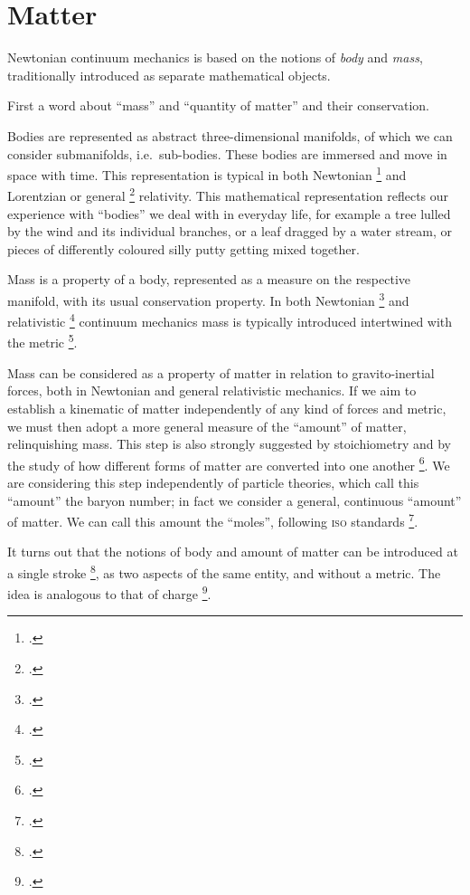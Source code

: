 \documentclass[\ifafour a4paper,12pt,\else a5paper,10pt,\fi%
onecolumn,oneside,article,%
british%
]{memoir}
\theoremstyle{remark}
\theoremstyle{innote}
\newcommand*{\citep}{\footcites}%
\renewcommand*{\|}{\nonscript\,\vert\nonscript\;\mathopen{}}
\newcommand*{\sect}{\S}%
\newcommand*{\sects}{\S\S}%
\newcommand*{\chap}{ch.}%
\newcommand*{\ie}{{i.e.}}
\newcommand*{\eg}{{e.g.}}
\newcommand*{\cf}{{cf.}}
\begin{document}
\section{Matter}
\label{sec:matter}


Newtonian continuum mechanics is based on the notions of \emph{body} and
\emph{mass}, traditionally introduced as separate mathematical objects.

First a word about \enquote{mass} and \enquote{quantity of matter} and
their conservation.

Bodies are represented as abstract three-dimensional manifolds, of which we
can consider submanifolds, \ie\ sub-bodies. These bodies are immersed and
move in space with time. This representation is typical in both Newtonian
\citep[\sects~I.2--3]{truesdell1977_r1991}{noll1959,noll1973} and
Lorentzian or general \citep{grotetal1966,carteretal1972} relativity. This
mathematical representation reflects our experience with \enquote{bodies}
we deal with in everyday life, for example a tree lulled by the wind and
its individual branches, or a leaf dragged by a water stream, or pieces of
differently coloured silly putty getting mixed together.

Mass is a property of a body, represented as a measure on the respective
manifold, with its usual conservation property. In both Newtonian
\citep[\sects~I.4]{truesdell1977_r1991}{noll1959,noll1973} and relativistic
\citep{grotetal1966}[\chap~3]{rezzollaetal2013} continuum mechanics mass is
typically introduced intertwined with the metric \citep[being an
exception]{carteretal1972}.

Mass can be considered as a property of matter in relation to
gravito-inertial forces, both in Newtonian and general relativistic
mechanics. If we aim to establish a kinematic of matter independently of
any kind of forces and metric, we must then adopt a more general measure of
the \enquote{amount} of matter, relinquishing mass. This step is also
strongly suggested by stoichiometry and by the study of how different forms
of matter are converted into one another
\citep[\eg][\sects~4.1--2]{samohyletal1987_r2014}[see
also][]{samohyl1975b}. We are considering this step independently of
particle theories, which call this \enquote{amount} the baryon number; in
fact we consider a general, continuous \enquote{amount} of matter. We can
call this amount the \enquote{moles}, following \textsc{iso} standards
\citep{iso2009,iso2009d}.

It turns out that the notions of body and amount of matter can be
introduced at a single stroke \citep[\cf][]{carteretal1972}, as two aspects
of the same entity, and without a metric. The idea is analogous to that of
charge
\citep{burke1983,bossavit1998b,hehletal2000}[\sect~B.1]{hehletal2003}.
\end{document}
